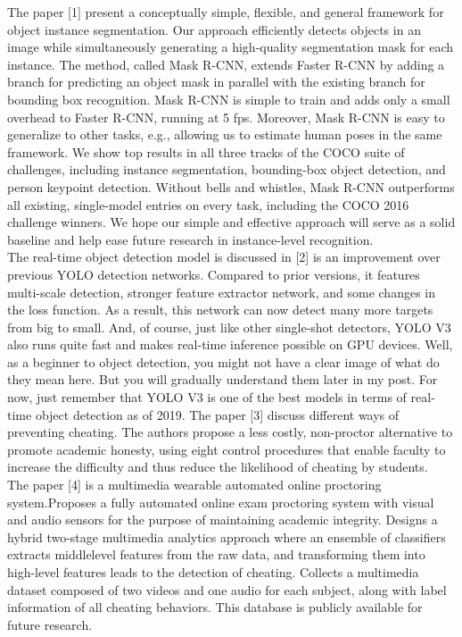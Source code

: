 \documentclass[12pt]{report}
\begin{document}
The paper [1] present a conceptually simple, flexible, and general framework for object instance segmentation. Our approach efficiently detects objects in an image while simultaneously generating a high-quality segmentation mask for each instance. The method, called Mask R-CNN, extends Faster R-CNN by adding a branch for predicting an object mask in parallel with the existing branch for bounding box recognition. Mask R-CNN is simple to train and adds only a small overhead to Faster R-CNN, running at 5 fps. Moreover, Mask R-CNN is easy to generalize to other tasks, e.g., allowing us to estimate human poses in the same framework. We show top results in all three tracks of the COCO suite of challenges, including instance segmentation, bounding-box object detection, and person keypoint detection. Without bells and whistles, Mask R-CNN outperforms all existing, single-model entries on every task, including the COCO 2016 challenge winners. We hope our simple and effective approach will serve as a solid baseline and help ease future research in instance-level recognition.\\

 The real-time object detection model is discussed in [2] is an improvement over previous YOLO detection networks. Compared to prior versions, it features multi-scale detection, stronger feature extractor network, and some changes in the loss function. As a result, this network can now detect many more targets from big to small. And, of course, just like other single-shot detectors, YOLO V3 also runs quite fast and makes real-time inference possible on GPU devices. Well, as a beginner to object detection, you might not have a clear image of what do they mean here. But you will gradually understand them later in my post. For now, just remember that YOLO V3 is one of the best models in terms of real-time object detection as of 2019.
\newpage
The paper [3] discuss different ways of preventing cheating. The authors propose a less costly, non-proctor alternative to promote academic honesty, using eight control procedures that enable faculty to increase the difficulty and thus reduce the likelihood of cheating by students.\\

The paper [4] is a  multimedia wearable automated online proctoring system.Proposes a fully automated online exam proctoring system with visual and audio sensors for the purpose of maintaining academic integrity.  Designs a hybrid two-stage multimedia analytics approach where an ensemble of classifiers extracts middlelevel features from the raw data, and transforming them into high-level features leads to the detection of cheating.  Collects a multimedia dataset composed of two videos and one audio for each subject, along with label information of all cheating behaviors. This database is publicly available for future research.\\
\end{document}

